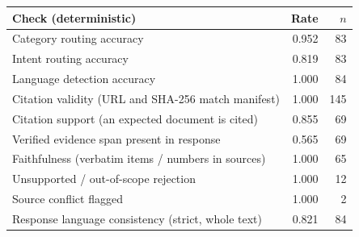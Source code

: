 \begin{tabular}{@{}lrr@{}}
\toprule
Check (deterministic) & Rate & $n$ \\
\midrule
Category routing accuracy & 0.952 & 83 \\
Intent routing accuracy & 0.819 & 83 \\
Language detection accuracy & 1.000 & 84 \\
Citation validity (URL and SHA-256 match manifest) & 1.000 & 145 \\
Citation support (an expected document is cited) & 0.855 & 69 \\
Verified evidence span present in response & 0.565 & 69 \\
Faithfulness (verbatim items / numbers in sources) & 1.000 & 65 \\
Unsupported / out-of-scope rejection & 1.000 & 12 \\
Source conflict flagged & 1.000 & 2 \\
Response language consistency (strict, whole text) & 0.821 & 84 \\
\bottomrule
\end{tabular}